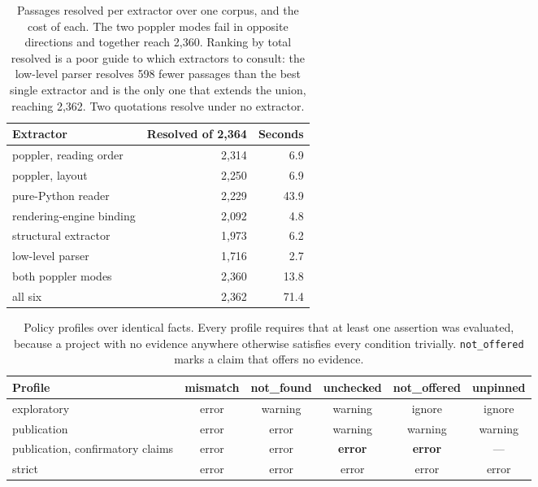 \documentclass{article}
\newcommand{\code}[1]{\texttt{#1}}
\begin{document}
\begin{table}[H]
\centering
\small
\caption{Passages resolved per extractor over one corpus, and the cost of each. The two poppler
modes fail in opposite directions and together reach 2{,}360. Ranking by total resolved is a poor
guide to which extractors to consult: the low-level parser resolves 598 fewer passages than the
best single extractor and is the only one that extends the union, reaching 2{,}362. Two quotations
resolve under no extractor.}
\label{tab:readers}
\begin{tabular}{@{}lrr@{}}
\toprule
\textbf{Extractor} & \textbf{Resolved of 2{,}364} & \textbf{Seconds} \\
\midrule
poppler, reading order & 2{,}314 & 6.9 \\
poppler, layout & 2{,}250 & 6.9 \\
pure-Python reader & 2{,}229 & 43.9 \\
rendering-engine binding & 2{,}092 & 4.8 \\
structural extractor & 1{,}973 & 6.2 \\
low-level parser & 1{,}716 & 2.7 \\
\midrule
both poppler modes & 2{,}360 & 13.8 \\
all six & 2{,}362 & 71.4 \\
\bottomrule
\end{tabular}
\end{table}

\begin{table}[H]
\centering
\small
\caption{Policy profiles over identical facts. Every profile requires that at least one assertion
was evaluated, because a project with no evidence anywhere otherwise satisfies every condition
trivially. \code{not\_offered} marks a claim that offers no evidence.}
\label{tab:policy}
\begin{tabular}{@{}lccccc@{}}
\toprule
\textbf{Profile} & \textbf{mismatch} & \textbf{not\_found} & \textbf{unchecked} & \textbf{not\_offered} & \textbf{unpinned} \\
\midrule
exploratory & error & warning & warning & ignore & ignore \\
publication & error & error & warning & warning & warning \\
publication, confirmatory claims & error & error & \textbf{error} & \textbf{error} & --- \\
strict & error & error & error & error & error \\
\bottomrule
\end{tabular}
\end{table}
\end{document}
